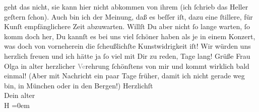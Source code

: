 \begin{ledgroupsized}[t]{13cm}
               geht das nicht, sie kann hier nicht abkommen von ihrem \label{K_L02204_1v}\label{K_L02204_1h} (ich ſchrieb das Heller geſtern ſchon). Auch bin ich der Meinung, daß es beſſer iſt, dazu
               eine ſtillere, für Kunſt empfänglichere Zeit abzuwarten. Willſt Du aber nicht ſo
               lange warten, ſo komm doch her, Du kannſt es bei uns viel ſchöner haben als je in
               einem Konzert, was doch von vorneherein die ſcheußlichſte Kunstwidrigkeit iſt! Wir
               würden uns herzlich freuen und ich hätte ja ſo viel mit Dir zu reden, Tage lang!\pend
           \pstart
           Grüße Frau Olga in alter herzlicher
                  \textcolor{gray}{Ve}rehrung ſchönſtens von mir und kommt wirklich bald einmal!
               (Aber mit Nachricht ein paar Tage früher, damit ich nicht gerade weg bin, in München oder in den Bergen!)\pend
           \pstart
           Herzlichſt{\\[\baselineskip]}Dein alter{\\[\baselineskip]}\spacefill\mbox{H}\pend
           \leftskip=0em{}
         
         \endnumbering{}\end{ledgroupsized}  \newcommand{\dateiname}{L02204}\newcommand{\titel}{Hermann Bahr an Arthur Schnitzler, 10. 2. 1915}\newcommand{\editorInnen}{ Kurt Ifkovits,  Martin Anton Müller}
      